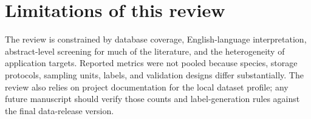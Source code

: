 \documentclass[11pt]{article}
\begin{document}
\section{Limitations of this review}

The review is constrained by database coverage, English-language interpretation, abstract-level screening for much of the literature, and the heterogeneity of application targets. Reported metrics were not pooled because species, storage protocols, sampling units, labels, and validation designs differ substantially. The review also relies on project documentation for the local dataset profile; any future manuscript should verify those counts and label-generation rules against the final data-release version.


\nocite{*}

\end{document}
